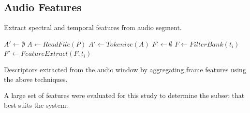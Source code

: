 \subsection{Audio Features}
\begin{algorithm}
    \caption{Extract spectral and temporal features from audio segment.}
    \label{alg:encoder}
    \SetAlgoLined
        
     {
        $A' \gets \emptyset$\;
        $A \gets ReadFile(P)$\;
        $A' \gets Tokenize(A)$\;
         {
            $F' \gets \emptyset$\;
            $F \gets FilterBank(t_i)$
            $F' \gets FeatureExtract(F, t_i)$
        }
    }
\end{algorithm}


\begin{table}[t!]
\centering

\caption{
 Descriptors extracted from the audio window by
 aggregating frame features using the above techniques. }
\label{tab:stats}
\end{table}

A large set of features were evaluated for this study to determine the subset that best suits the system.

